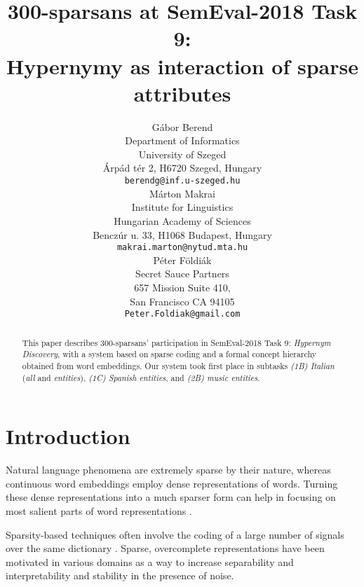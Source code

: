 \documentclass[11pt,a4paper]{article}
\title{300-sparsans at SemEval-2018 Task 9: \\
Hypernymy as interaction of sparse attributes}
\author{Gábor Berend \\
Department of Informatics \\ University of Szeged \\
Árpád tér 2, H6720 Szeged, Hungary \\
{\tt berendg@inf.u-szeged.hu} \\\And
  Márton Makrai  \\
  Institute for Linguistics \\
  Hungarian Academy of Sciences \\
  Benczúr u. 33, H1068 Budapest, Hungary \\
  {\tt makrai.marton@nytud.mta.hu} \\\AND
  Péter Földiák \\
  Secret Sauce Partners \\
  657 Mission Suite 410, \\
  San Francisco CA 94105 \\
  {\tt Peter.Foldiak@gmail.com} \\}
\date{}
\begin{document}
\maketitle

\begin{abstract}
  This paper describes 300-sparsans’ participation in SemEval-2018 Task 9:
  \emph{Hypernym Discovery}, with a system based on sparse coding and a formal
  concept hierarchy obtained from word embeddings.
  Our system took first place in subtasks
  \emph{(1B) Italian} (\emph{all} and \emph{entities}),
  \emph{(1C) Spanish entities}, and
  \emph{(2B) music entities}.
\end{abstract}


\section{Introduction}

Natural language phenomena are extremely sparse by their nature,
whereas continuous word embeddings employ dense representations of words.
Turning these dense representations into a much sparser form can help in
focusing on most salient parts of word representations
\citep{Faruqui:2015,Berend:2017,Subramanian:2018}.


Sparsity-based techniques often involve the coding of a large number of signals
over the same dictionary \citep{Rubinstein:2008}. Sparse, overcomplete
representations have been motivated in various domains as a way to increase
separability and interpretability \citep{Olshausen:1997} and
stability in the presence of noise.
\end{document}
